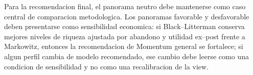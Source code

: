 \documentclass[11pt]{article}
\begin{document}
Para la recomendacion final, el panorama neutro debe mantenerse como caso central de comparacion metodologica. Los panoramas favorable y desfavorable deben presentarse como sensibilidad economica: si Black--Litterman conserva mejores niveles de riqueza ajustada por abandono y utilidad ex--post frente a Markowitz, entonces la recomendacion de Momentum general se fortalece; si algun perfil cambia de modelo recomendado, ese cambio debe leerse como una condicion de sensibilidad y no como una recalibracion de la view.
\end{document}

